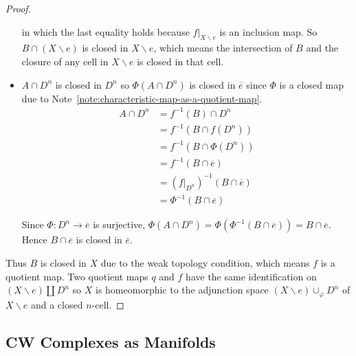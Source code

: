 \begin{proof}
\begin{itemize}[leftmargin=*]
		      in which the last equality holds because \( f\vert_{X\smallsetminus e} \) is an inclusion map. So \( B\cap (X\smallsetminus e) \) is closed in \( X \smallsetminus e \), which means the intersection of \( B \) and the closure of any cell in \( X\smallsetminus e \) is closed in that cell.
		\item \( A \cap D^{n} \) is closed in \( D^{n} \) so \( \Phi(A\cap D^{n}) \) is closed in \( \overline{e} \) since \( \Phi \) is a closed map due to Note~\ref{note:characteristic-map-as-a-quotient-map}.
		      \begingroup
		      \allowdisplaybreaks
		      \begin{align*}
			      A\cap D^{n} & = f^{-1}(B) \cap D^{n}                         \\
			                  & = f^{-1}(B \cap f(D^{n}))                      \\
			                  & = f^{-1}(B \cap \Phi(D^{n}))                   \\
			                  & = f^{-1}(B \cap \overline{e})                  \\
			                  & = {(f\vert_{D^{n}})}^{-1}(B \cap \overline{e}) \\
			                  & = \Phi^{-1}(B\cap \overline{e})
		      \end{align*}
		      \endgroup

		      Since \( \Phi: D^{n} \to \overline{e} \) is surjective, \( \Phi(A \cap D^{n}) = \Phi(\Phi^{-1}(B \cap \overline{e})) = B \cap \overline{e} \). Hence \( B\cap \overline{e} \) is closed in \( \overline{e} \).
	\end{itemize}

	Thus \( B \) is closed in \( X \) due to the weak topology condition, which means \( f \) is a quotient map. Two quotient maps \( q \) and \( f \) have the same identification on \( (X\smallsetminus e) \amalg D^{n} \) so \( X \) is homeomorphic to the adjunction space \( (X\smallsetminus e) \cup_{\varphi} D^{n} \) of \( X \smallsetminus e \) and a closed \( n \)-cell.
\end{proof}


\subsection*{CW Complexes as Manifolds}



